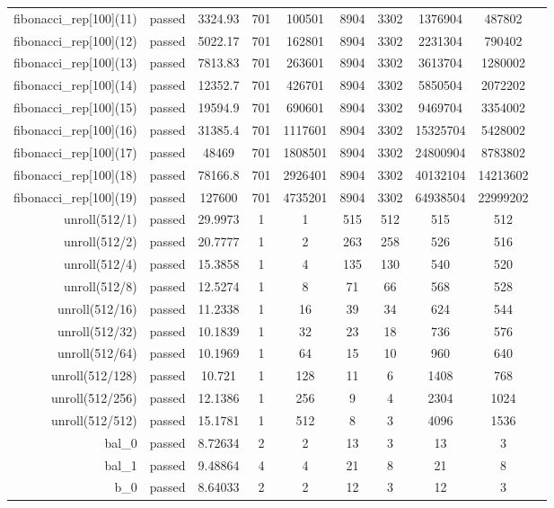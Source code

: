 \begin{longtable}{r|ccccccccc}
    fibonacci\_rep[100](11) & passed & 3324.93 & 701 & 100501 & 8904 & 3302 & 1376904 & 487802 \\
    fibonacci\_rep[100](12) & passed & 5022.17 & 701 & 162801 & 8904 & 3302 & 2231304 & 790402 \\
    fibonacci\_rep[100](13) & passed & 7813.83 & 701 & 263601 & 8904 & 3302 & 3613704 & 1280002 \\
    fibonacci\_rep[100](14) & passed & 12352.7 & 701 & 426701 & 8904 & 3302 & 5850504 & 2072202 \\
    fibonacci\_rep[100](15) & passed & 19594.9 & 701 & 690601 & 8904 & 3302 & 9469704 & 3354002 \\
    fibonacci\_rep[100](16) & passed & 31385.4 & 701 & 1117601 & 8904 & 3302 & 15325704 & 5428002 \\
    fibonacci\_rep[100](17) & passed & 48469 & 701 & 1808501 & 8904 & 3302 & 24800904 & 8783802 \\
    fibonacci\_rep[100](18) & passed & 78166.8 & 701 & 2926401 & 8904 & 3302 & 40132104 & 14213602 \\
    fibonacci\_rep[100](19) & passed & 127600 & 701 & 4735201 & 8904 & 3302 & 64938504 & 22999202 \\
    unroll(512/1) & passed & 29.9973 & 1 & 1 & 515 & 512 & 515 & 512 \\
    unroll(512/2) & passed & 20.7777 & 1 & 2 & 263 & 258 & 526 & 516 \\
    unroll(512/4) & passed & 15.3858 & 1 & 4 & 135 & 130 & 540 & 520 \\
    unroll(512/8) & passed & 12.5274 & 1 & 8 & 71 & 66 & 568 & 528 \\
    unroll(512/16) & passed & 11.2338 & 1 & 16 & 39 & 34 & 624 & 544 \\
    unroll(512/32) & passed & 10.1839 & 1 & 32 & 23 & 18 & 736 & 576 \\
    unroll(512/64) & passed & 10.1969 & 1 & 64 & 15 & 10 & 960 & 640 \\
    unroll(512/128) & passed & 10.721 & 1 & 128 & 11 & 6 & 1408 & 768 \\
    unroll(512/256) & passed & 12.1386 & 1 & 256 & 9 & 4 & 2304 & 1024 \\
    unroll(512/512) & passed & 15.1781 & 1 & 512 & 8 & 3 & 4096 & 1536 \\
    bal\_0 & passed & 8.72634 & 2 & 2 & 13 & 3 & 13 & 3 \\
    bal\_1 & passed & 9.48864 & 4 & 4 & 21 & 8 & 21 & 8 \\
    b\_0 & passed & 8.64033 & 2 & 2 & 12 & 3 & 12 & 3 \\

\end{longtable}
